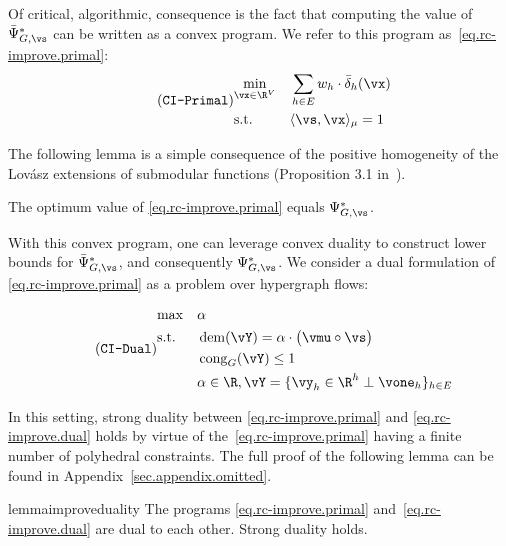 \documentclass[letterpaper]{article}
\newcommand{\dem}{\operatorname{dem}}
\renewcommand{\cong}{\operatorname{cong}}
\begin{document}
Of critical, algorithmic, consequence is the fact that computing the value of $\bar{\Psi}_{G, \vs}^*$ can be written as a convex program. We refer to this program as~\eqref{eq.rc-improve.primal}:
\begin{equation*}
\stepcounter{equation}
\tag{\texttt{CI-Primal}}
\label{eq.rc-improve.primal}
\begin{aligned}
& \underset{\vx \in \R^V}{\min}
& & \sum_{h \in E} w_h \cdot \bar{\delta}_{h}(\vx) \\
& \textup{s.t.}
& & \langle \vs, \vx \rangle_{\mu} = 1
\end{aligned}
\end{equation*}


The following lemma is a simple consequence of the positive homogeneity of the Lov\'asz extensions of submodular functions (Proposition 3.1 in~\cite{bach2013learning}).
\begin{lemma}
\label{lem.rc-improve.primal-val}
The optimum value of \eqref{eq.rc-improve.primal} equals $\Psi^*_{G,\vs}$.
\end{lemma}

With this convex program, one can leverage convex duality to construct lower bounds for $\bar{\Psi}^*_{G, \vs}$, and consequently $\Psi^*_{G, \vs}$. We consider a dual formulation of \eqref{eq.rc-improve.primal} as a problem over hypergraph flows:

\begin{equation*}
\stepcounter{equation}
\tag{\texttt{CI-Dual}}
\label{eq.rc-improve.dual}
\begin{aligned}
&  {\max}
& & \alpha \\
& \textup{s.t.}
& & \dem(\vY) = \alpha \cdot \big( \vmu \circ \vs \big) \\
& & & \cong_G(\vY) \leq 1\\
& & &  \alpha \in \R, \vY =\{\vy_h \in \R^h \perp \vone_h\}_{h\in E}
\end{aligned}
\end{equation*}

In this setting, strong duality between \eqref{eq.rc-improve.primal} and \eqref{eq.rc-improve.dual} holds by virtue of the~\eqref{eq.rc-improve.primal} having a finite number of polyhedral constraints. The full proof of the following lemma can be found in Appendix~\ref{sec.appendix.omitted}.
\begin{restatable}{lemma}{improveduality}
\label{lem.rc-improve.strong-duality}
The programs \eqref{eq.rc-improve.primal} and~\eqref{eq.rc-improve.dual} are dual to each other. Strong duality holds.
\end{restatable}
\noindent
\end{document}

